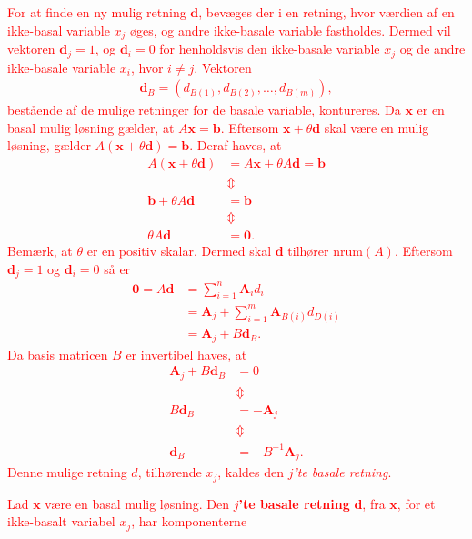 \textcolor{red}{
For at finde en ny mulig retning $\mathbf{d}$, bevæges der i en retning, hvor værdien af en ikke-basal variable $x_j$ øges, og andre ikke-basale variable fastholdes. 
Dermed vil vektoren $\mathbf{d}_j = 1$, og $\mathbf{d}_i = 0$ for henholdsvis den ikke-basale variable $x_j$ og de andre ikke-basale variable $x_i$, hvor $i \neq j$.
Vektoren 
\begin{align*}
\mathbf{d}_B = \left( d_{B(1)}, d_{B(2)}, \ldots , d_{B(m)} \right),
\end{align*} 
bestående af de mulige retninger for de basale variable, 
kontureres.
Da $\mathbf{x}$ er en basal mulig løsning gælder, at $A \mathbf{x} = \mathbf{b}$. 
Eftersom $\mathbf{x}+ \theta \mathbf{d}$ skal være en mulig løsning, gælder $A ( \mathbf{x}+ \theta \mathbf{d}) = \mathbf{b}$.
Deraf haves, at 
\begin{align*}
A ( \mathbf{x}+ \theta \mathbf{d}) &=  A \mathbf{x} + \theta A \mathbf{d} = \mathbf{b} \\
& \Updownarrow \\
\mathbf{b} + \theta A \mathbf{d} & = \mathbf{b} \\
& \Updownarrow \\
\theta A \mathbf{d} & = \mathbf{0}.
\end{align*} 
Bemærk, at $\theta$ er en positiv skalar. 
Dermed skal $\mathbf{d}$ tilhører $\text{nrum}(A)$.
Eftersom $\mathbf{d}_j = 1$ og $\mathbf{d}_i = 0$ så er 
%
\begin{align*}
\mathbf{0} = A \mathbf{d} & = \sum^n_{i = 1} \mathbf{A}_i d_i \\
& =  \mathbf{A}_j  + \sum^m_{i = 1} \mathbf{A}_{B(i)} d_{D(i)} \\
& =  \mathbf{A}_j  + B \mathbf{d}_B.
\end{align*}
%
Da basis matricen $B$ er invertibel haves, at 
% 
\begin{align*}
\mathbf{A}_j  + B \mathbf{d}_B & = 0 \\
& \Updownarrow \\
B \mathbf{d}_B & = - \mathbf{A}_j \\
& \Updownarrow \\
\mathbf{d}_B & = - B^{-1} \mathbf{A}_j .
\end{align*}
% 
Denne mulige retning $d$, tilhørende $x_j$, kaldes den \textit{$j$'te basale retning}.
% 
\begin{defn}{}{}
Lad $\mathbf{x}$ være en basal mulig løsning. 
Den \textbf{$j$'te basale retning} $\mathbf{d}$, fra $\mathbf{x}$, for et ikke-basalt variabel $x_j$, har komponenterne 

\end{defn}}
